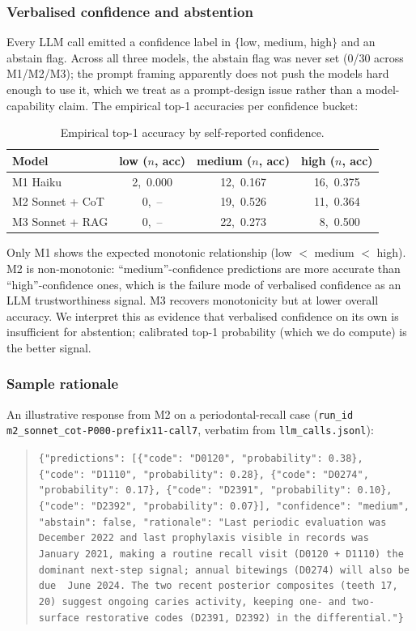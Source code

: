 \documentclass[preprint,authoryear,1p,12pt]{elsarticle}
\begin{document}
\subsubsection{Verbalised confidence and abstention}

Every LLM call emitted a confidence label in $\{$low, medium, high$\}$
and an abstain flag. Across all three models, the abstain flag was
never set (0/30 across M1/M2/M3); the prompt framing apparently does
not push the models hard enough to use it, which we treat as a
prompt-design issue rather than a model-capability claim. The empirical
top-1 accuracies per confidence bucket:

\begin{table}[h!]
\centering
\caption{Empirical top-1 accuracy by self-reported confidence.}
\label{tab:verbalized}
\begin{tabular}{lccc}
\toprule
Model & low ($n$, acc) & medium ($n$, acc) & high ($n$, acc) \\
\midrule
M1 Haiku             & 2,~0.000 & 12,~0.167 & 16,~0.375 \\
M2 Sonnet + CoT      & 0,~--    & 19,~0.526 & 11,~0.364 \\
M3 Sonnet + RAG      & 0,~--    & 22,~0.273 & ~8,~0.500 \\
\bottomrule
\end{tabular}
\end{table}

Only M1 shows the expected monotonic relationship (low $<$ medium $<$
high). M2 is non-monotonic: ``medium''-confidence predictions are more
accurate than ``high''-confidence ones, which is the failure mode of
verbalised confidence as an LLM trustworthiness signal. M3 recovers
monotonicity but at lower overall accuracy. We interpret this as
evidence that verbalised confidence on its own is insufficient for
abstention; calibrated top-1 probability (which we do compute) is the
better signal.

\subsubsection{Sample rationale}

An illustrative response from M2 on a periodontal-recall case
(\texttt{run\_id\,m2\_sonnet\_cot-P000\textellipsis-prefix11-call7},
verbatim from \texttt{llm\_calls.jsonl}):

\begin{quote}\small
\texttt{\{"predictions": [\{"code": "D0120", "probability": 0.38\},
\{"code": "D1110", "probability": 0.28\}, \{"code": "D0274", "probability":
0.17\}, \{"code": "D2391", "probability": 0.10\}, \{"code": "D2392",
"probability": 0.07\}], "confidence": "medium", "abstain": false,
"rationale": "Last periodic evaluation was December 2022 and last
prophylaxis visible in records was January 2021, making a routine recall
visit (D0120 + D1110) the dominant next-step signal; annual bitewings
(D0274) will also be due ~June 2024. The two recent posterior composites
(teeth 17, 20) suggest ongoing caries activity, keeping one- and
two-surface restorative codes (D2391, D2392) in the differential."\}}
\end{quote}
\end{document}
